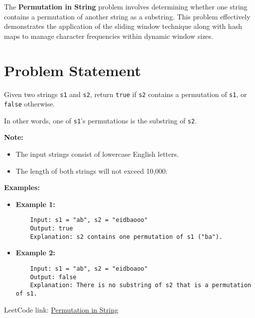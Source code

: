 
\label{chap:permutation_in_string}

The \textbf{Permutation in String} problem involves determining whether one string contains a permutation of another string as a substring. This problem effectively demonstrates the application of the sliding window technique along with hash maps to manage character frequencies within dynamic window sizes.

\section*{Problem Statement}

Given two strings \texttt{s1} and \texttt{s2}, return \texttt{true} if \texttt{s2} contains a permutation of \texttt{s1}, or \texttt{false} otherwise.

In other words, one of \texttt{s1}'s permutations is the substring of \texttt{s2}.

\textbf{Note:}
\begin{itemize}
    \item The input strings consist of lowercase English letters.
    \item The length of both strings will not exceed 10,000.
\end{itemize}

\textbf{Examples:}

\begin{itemize}
    \item \textbf{Example 1:}
    \begin{verbatim}
    Input: s1 = "ab", s2 = "eidbaooo"
    Output: true
    Explanation: s2 contains one permutation of s1 ("ba").
    \end{verbatim}

    \item \textbf{Example 2:}
    \begin{verbatim}
    Input: s1 = "ab", s2 = "eidboaoo"
    Output: false
    Explanation: There is no substring of s2 that is a permutation of s1.
    \end{verbatim}
\end{itemize}

LeetCode link: \href{https://leetcode.com/problems/permutation-in-string/}{Permutation in String}

